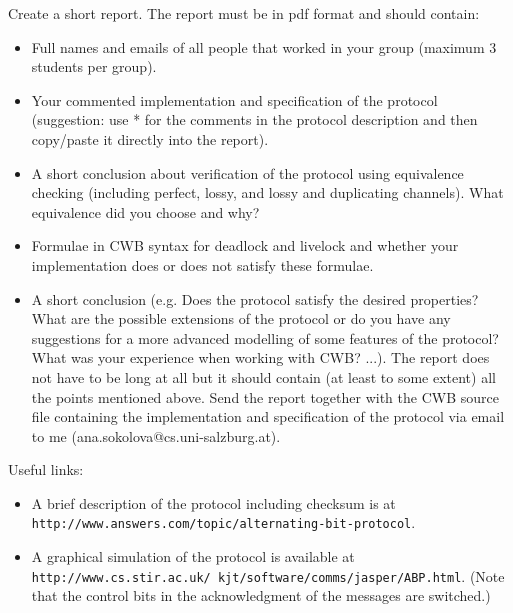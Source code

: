 \documentclass{article}
\begin{document}
Create a short report. The report must be in pdf format and should
contain:
\begin{itemize}
          \item Full names and emails of all people that worked in your group (maximum 3 students per group).
          \item Your commented implementation and specification of the protocol (suggestion: use * for the comments in the protocol description and then copy/paste it directly into the report).
          \item A short conclusion about verification of the protocol using equivalence checking (including perfect, lossy, and lossy and duplicating channels). What equivalence did you choose and why?
          \item Formulae in CWB syntax for deadlock and livelock and whether your implementation does or does not satisfy these formulae.
          \item A short conclusion (e.g. Does the protocol satisfy the desired properties? What are the possible extensions of the protocol or do you have any suggestions for a more advanced modelling of some features of the protocol? What was your experience when working with CWB? ...).
      The report does not have to be long at all but it should contain (at least to some extent) all
      the points mentioned above. Send the report together with the CWB source file containing the
      implementation and specification of the protocol via email to me (ana.sokolova@cs.uni-salzburg.at).
\end{itemize}
Useful links:
\begin{itemize}
    \item A brief description of the protocol including checksum is at \\ {\tt{http://www.answers.com/topic/alternating-bit-protocol}}.
    \item A graphical simulation of the protocol is available at\\ {\tt{http://www.cs.stir.ac.uk/~kjt/software/comms/jasper/ABP.html}}.
    (Note that the control bits in the acknowledgment of the messages are switched.)
\end{itemize}
\end{document}
